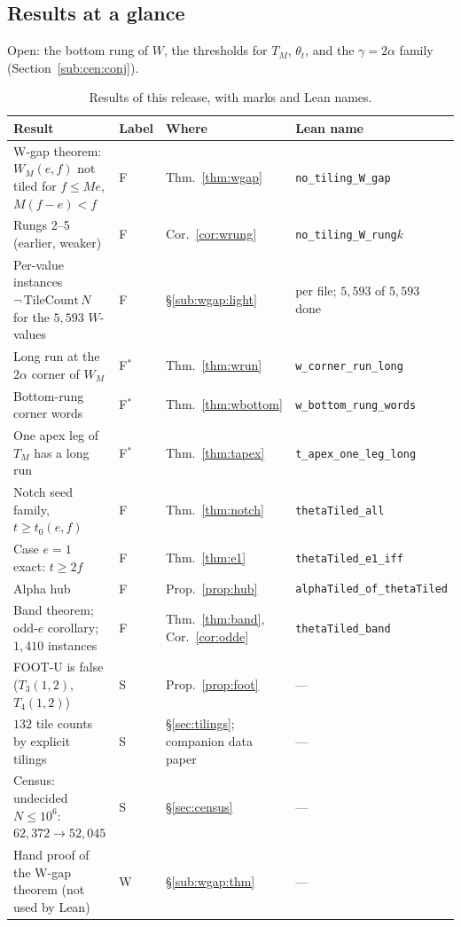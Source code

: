 \documentclass[11pt,reqno]{amsart}
\theoremstyle{plain}
\theoremstyle{definition}
\newcommand{\sF}{\textup{\textsf{F}}}
\newcommand{\sW}{\textup{\textsf{W}}}
\newcommand{\sS}{\textup{\textsf{S}}}
\begin{document}
\subsection{Results at a glance}\label{sub:intro:glance}
Open: the bottom rung of $W$, the thresholds for $T_M$, $\theta_t$, and the $\gamma=2\alpha$ family (Section~\ref{sub:cen:conj}).
\begin{table}[h]\centering\footnotesize
\begin{tabular}{@{}p{4.9cm}p{0.9cm}p{2.6cm}p{4.5cm}@{}}
\hline
Result & Label & Where & Lean name\\\hline
W-gap theorem: $W_M(e,f)$ not tiled for $f\le Me$, $M(f-e)<f$ & \sF & Thm.~\ref{thm:wgap} & \texttt{no\_tiling\_W\_gap}\\
Rungs 2--5 (earlier, weaker) & \sF & Cor.~\ref{cor:wrung} & \texttt{no\_tiling\_W\_rung$k$}\\
Per-value instances $\neg\,\mathrm{TileCount}\,N$ for the $5{,}593$ $W$-values & \sF & \S\ref{sub:wgap:light} & per file; $5{,}593$ of $5{,}593$ done\\
Long run at the $2\alpha$ corner of $W_M$ & \sF$^\ast$ & Thm.~\ref{thm:wrun} & \texttt{w\_corner\_run\_long}\\
Bottom-rung corner words & \sF$^\ast$ & Thm.~\ref{thm:wbottom} & \texttt{w\_bottom\_rung\_words}\\
One apex leg of $T_M$ has a long run & \sF$^\ast$ & Thm.~\ref{thm:tapex} & \texttt{t\_apex\_one\_leg\_long}\\
Notch seed family, $t\ge t_0(e,f)$ & \sF & Thm.~\ref{thm:notch} & \texttt{thetaTiled\_all}\\
Case $e=1$ exact: $t\ge2f$ & \sF & Thm.~\ref{thm:e1} & \texttt{thetaTiled\_e1\_iff}\\
Alpha hub & \sF & Prop.~\ref{prop:hub} & \texttt{alphaTiled\_of\_thetaTiled}\\
Band theorem; odd-$e$ corollary; $1{,}410$ instances & \sF & Thm.~\ref{thm:band}, Cor.~\ref{cor:odde} & \texttt{thetaTiled\_band}\\
FOOT-U is false ($T_3(1,2)$, $T_4(1,2)$) & \sS & Prop.~\ref{prop:foot} & ---\\
$132$ tile counts by explicit tilings & \sS & \S\ref{sec:tilings}; companion data paper & ---\\
Census: undecided $N\le10^6$: $62{,}372\to52{,}045$ & \sS & \S\ref{sec:census} & ---\\
Hand proof of the W-gap theorem (not used by Lean) & \sW & \S\ref{sub:wgap:thm} & ---\\\hline
\end{tabular}
\caption{Results of this release, with marks and Lean names.}\label{tab:glance}
\end{table}
\end{document}
